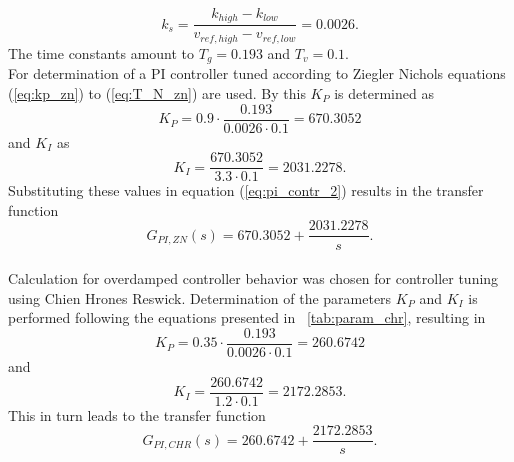 \begin{equation}
  k_s = \frac{k_{high}-k_{low}}{v_{ref,high}-v_{ref,low}}= 0.0026.
\label{eq:k_s_2}
\end{equation}
The time constants amount to $T_g=0.193$ and $T_v=0.1$.
\\For determination of a PI controller tuned according to Ziegler Nichols equations (\ref{eq:kp_zn}) to (\ref{eq:T_N_zn}) are used. By this $K_{P}$ is determined as
\begin{equation}
  K_{P} = 0.9\cdot\frac{0.193}{0.0026\cdot0.1}=670.3052
\end{equation}
and $K_I$ as
\begin{equation}
  K_{I}  = \frac{670.3052}{3.3\cdot0.1}=2031.2278.
\end{equation}
Substituting these values in equation (\ref{eq:pi_contr_2}) results in the transfer function
\begin{equation}
  G_{PI,ZN}(s)=670.3052+\frac{2031.2278}{s}.
\end{equation}
\\Calculation for overdamped controller behavior was chosen for controller tuning using Chien Hrones Reswick. Determination of the parameters $K_P$ and $K_I$ is performed following the equations presented in \tablename~\ref{tab:param_chr}, resulting in
\begin{equation}
  K_P = 0.35\cdot\frac{0.193}{0.0026\cdot0.1}=260.6742
\end{equation}
and
\begin{equation}
  K_I = \frac{260.6742}{1.2\cdot0.1}=2172.2853.
\end{equation}
This in turn leads to the transfer function
\begin{equation}
  G_{PI,CHR}(s)=260.6742+\frac{2172.2853}{s}.
\end{equation}
